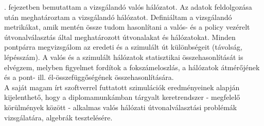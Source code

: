 . fejezetben bemutattam a vizsgálandó valós hálózatot. Az adatok feldolgozása után meghatároztam a vizsgálandó hálózatot. Definiáltam a vizsgálandó metrikákat, amik mentén össze tudom hasonlítani a valós- és a policy vezérelt útvonalválasztás által meghatározott útvonalakat és hálózatokat. Minden pontpárra megvizsgálom az eredeti és a szimulált út különbségeit (távolság, lépésszám). A valós és a szimulált hálózatok statisztikai összehasonlítását is elvégzem, melyben figyelmet fordítok a fokszámeloszlás, a hálózatok átmérőjének és a pont- ill. él-összefüggőségének összehasonlítására.\\

A saját magam írt szoftverrel futtatott szimulációk eredményeinek alapján kijelenthető, hogy a diplomamunkámban tárgyalt keretrendszer - megfelelő körülmények között - alkalmas valós hálózati útvonalválasztási problémák vizsgálatára, algebrák tesztelésére.